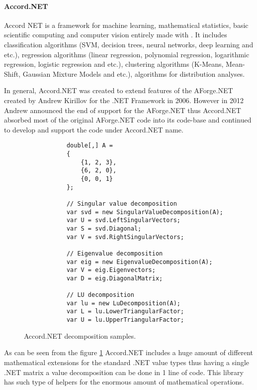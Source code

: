 \documentclass[../../../../main]{subfiles}
\begin{document}
\paragraph{Accord.NET}

Accord NET is a framework for machine learning, mathematical statistics, basic scientific computing and computer vision entirely made with {\Csharp}. It includes classification algorithms (\ac{SVM}, decision trees, neural networks, deep learning and etc.), regression algorithms (linear regression, polynomial regression, logarithmic regression, logistic regression and etc.), clustering algorithms (K-Means, Mean-Shift, Gaussian Mixture Models and etc.), algorithms for distribution analyses.

In general, Accord.NET was created to extend features of the AForge.NET created by Andrew Kirillov for the .NET Framework in 2006. However in 2012 Andrew announced the end of support for the AForge.NET thus Accord.NET absorbed most of the original AForge.NET code into its code-base and continued to develop and support the code under Accord.NET name.

\begin{figure} [!ht]
  \centering    
    \lstset{style=sharpc}
        \begin{lstlisting}
            double[,] A = 
            {
                {1, 2, 3},
                {6, 2, 0},
                {0, 0, 1}
            };

            // Singular value decomposition
            var svd = new SingularValueDecomposition(A);
            var U = svd.LeftSingularVectors;
            var S = svd.Diagonal;
            var V = svd.RightSingularVectors;

            // Eigenvalue decomposition
            var eig = new EigenvalueDecomposition(A);
            var V = eig.Eigenvectors;
            var D = eig.DiagonalMatrix;

            // LU decomposition
            var lu = new LuDecomposition(A);
            var L = lu.LowerTriangularFactor;
            var U = lu.UpperTriangularFactor;         
        \end{lstlisting}
  \caption{Accord.NET decomposition samples.}
  \label{accordnetdecompose}
\end{figure}

As can be seen from the figure \ref{accordnetdecompose} Accord.NET includes a huge amount of different mathematical extensions for the standard .NET value types thus having a single .NET matrix a value decomposition can be done in 1 line of code. This library has such type of helpers for the enormous amount of mathematical operations.
\end{document}
